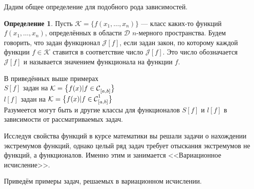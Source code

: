 \documentclass[12pt,a4paper,openany,fleqn]{book}
\newcommand{\Cf}{\ensuremath{\mathcal{C}}}
\newcommand{\J}{\ensuremath{\mathcal{J}}}
\newcommand{\mc}[1]{\ensuremath{\mathcal{#1}}}
\newcommand{\Cfn}[2][]{\ensuremath{\Cf{\mathstrut}^{#2}_{#1}}}
\theoremstyle{definition}
\newtheorem{_def}{Определение}[section]
\begin{document}
\noindent Дадим общее определение для подобного рода зависимостей.
\begin{_def}
	Пусть $\mc{K}=\{f(x_1,\ldots,x_n)\}$ --- класс каких-то функций $f(x_1,\ldots,x_n)$, определённых в области $\mc{D}$ $n$-мерного пространства. Будем говорить, что задан функционал $\J[f]$, если задан закон, по которому каждой функции $f\in\mc{K}$ ставится в соответствие число $\J[f]$. Это число обозначается $\J[f]$ и называется значением функционала на функции $f$.
\end{_def}

\noindent В приведённых выше примерах \\
\indent$S[f]$ задан на $\mc{K}=\big\{f(x)|f\in \Cfn[{[a,b]}]{}\big\}$\\
\indent $l[f]$ задан на $\mc{K}=\big\{f(x)|f\in \Cfn[{[a,b]}]{1}\big\}$\\
Разумеется могут быть и другие классы для функционалов $S[f]$ и $l[f]$ в зависимости от рассматриваемых задач.

Исследуя свойства функций в курсе математики вы решали задачи о нахождении экстремумов функций, однако целый ряд задач требует отыскания экстремумов не функций, а функционалов. Именно этим и занимается <<Вариационное исчисление>>.
\vspace{0.25cm}

Приведём примеры задач, решаемых в вариационном исчислении.
\end{document}
